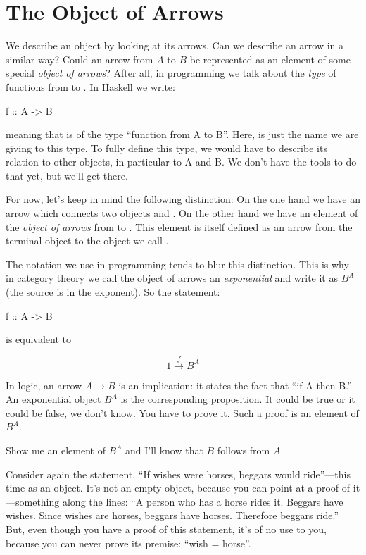 \documentclass[DaoFP]{subfiles}
\begin{document}
\section{The Object of Arrows}

We describe an object by looking at its arrows. Can we describe an arrow in a similar way? Could an arrow from $A$ to $B$ be represented as an element of some special \emph{object of arrows}? After all, in programming we talk about the \emph{type} of functions from  to . In Haskell we write:
\begin{haskell}
f :: A -> B
\end{haskell}
meaning that  is of the type ``function from A to B''. Here,  is just the name we are giving to this type. To fully define this type, we would have to describe its relation to other objects, in particular to A and B. We don't have the tools to do that yet, but we'll get there. 

For now, let's keep in mind the following distinction: On the one hand we have an arrow which connects two objects  and . On the other hand we have an element of the \emph{object of arrows} from   to . This element is itself defined as an arrow from the terminal object \hask{()} to the object we call . 

The notation we use in programming tends to blur this distinction. This is why in category theory we call the object of arrows an \emph{exponential} and write it as $ B^A$ (the source is in the exponent). So the statement:
\begin{haskell}
f :: A -> B
\end{haskell}
is equivalent to

\[ 1 \xrightarrow f B^A\]

In logic, an arrow $ A \to B$ is an implication: it states the fact that ``if A then B.'' An exponential object $ B^A$ is the corresponding proposition. It could be true or it could be false, we don't know. You have to prove it. Such a proof is an element of $ B^A$. 

Show me an element of $ B^A$ and I'll know that $ B$ follows from $ A$.

Consider again the statement, ``If wishes were horses, beggars would ride''---this time as an object. It's not an empty object, because you can point at a proof of it---something along the lines: ``A person who has a horse rides it. Beggars have wishes. Since wishes are horses, beggars have horses. Therefore beggars ride.'' But, even though you have a proof of this statement, it's of no use to you, because you can never prove its premise: ``wish = horse''. 
\end{document}
